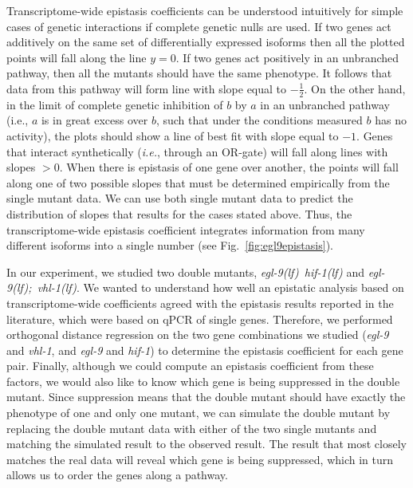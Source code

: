 \documentclass[9pt,twocolumn,twoside]{pnas-new}
\newcommand{\gene}[1]{\mbox{\emph{#1}}}
\newcommand{\eglvhl}{\gene{egl-9(lf); vhl-1(lf)}}
\newcommand{\eglhif}{\gene{egl-9(lf) hif-1(lf)}}
\begin{document}
Transcriptome-wide epistasis coefficients can be understood intuitively for
simple cases of genetic interactions if complete genetic nulls are used. If two
genes act additively on the same set of differentially expressed isoforms then
all the plotted points will fall along the line $y=0$. If two genes act
positively in an unbranched pathway, then all the mutants should have the same
phenotype. It follows that data from this pathway will form line with slope
equal to $-\frac{1}{2}$. On the other hand, in the limit of complete genetic
inhibition of $b$ by $a$ in an unbranched pathway (i.e., $a$ is in great excess
over $b$, such that under the conditions measured $b$ has no activity), the
plots should show a line of best fit with slope equal to $-1$. Genes that
interact synthetically (\emph{i.e.}, through an OR-gate) will fall along lines
with slopes $>0$. When there is epistasis of one gene over another, the points
will fall along one of two possible slopes that must be determined empirically
from the single mutant data. We can use both single mutant data to predict the
distribution of slopes that results for the cases stated above. Thus, the
transcriptome-wide epistasis coefficient integrates information from many
different isoforms into a single number (see Fig.~\ref{fig:egl9epistasis}).

In our experiment, we studied two double mutants, \eglhif{} and \eglvhl{}. We
wanted to understand how well an epistatic analysis based on transcriptome-wide
coefficients agreed with the epistasis results reported in the literature, which
were based on qPCR of single genes. Therefore, we performed orthogonal distance
regression on the two gene combinations we studied (\gene{egl-9} and
\gene{vhl-1}, and \gene{egl-9} and \gene{hif-1}) to determine the epistasis
coefficient for each gene pair.
\color{purple}
Finally, although we could compute an epistasis
coefficient from these factors, we would also like to know which gene is being
suppressed in the double mutant. Since suppression means that the double mutant
should have exactly the phenotype of one and only one mutant, we can simulate
the double mutant by replacing the double mutant data with either of the two
single mutants and matching the simulated result to the observed result. The
result that most closely matches the real data will reveal which gene is being
suppressed, which in turn allows us to order the genes along a pathway.
\color{black}
\end{document}
